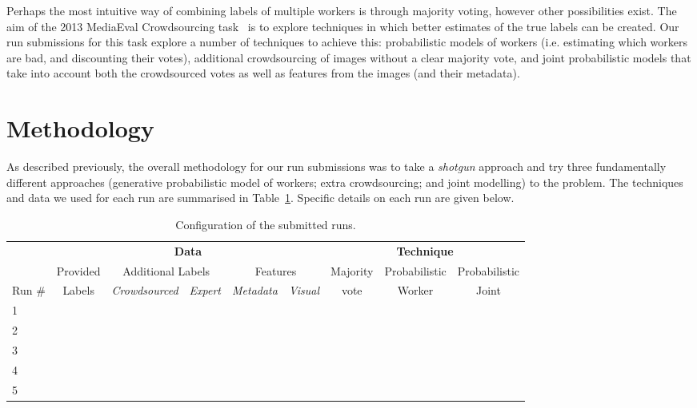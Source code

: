 \documentclass{../acm_proc_article-me11_tweaked}
\begin{document}
Perhaps the most intuitive way of combining labels of multiple workers is through majority voting, however other possibilities exist. The aim of the 2013 MediaEval Crowdsourcing task~\cite{CS2013} is to explore techniques in which better estimates of the true labels can be created. Our run submissions for this task explore a number of techniques to achieve this: probabilistic models of workers (i.e. estimating which workers are bad, and discounting their votes), additional crowdsourcing of images without a clear majority vote, and joint probabilistic models that take into account both the crowdsourced votes as well as features from the images (and their metadata).
	
\section{Methodology}
As described previously, the overall methodology for our run submissions was to take a \emph{shotgun} approach and try three fundamentally different approaches (generative probabilistic model of workers; extra crowdsourcing; and joint modelling) to the problem. The techniques and data we used for each run are summarised in Table~\ref{tab:config}. Specific details on each run are given below.

\begin{table}[t]
	\centering
	\caption{\label{tab:config}Configuration of the submitted runs.}
	\begin{tabular}{|l||c|c|c|c|c||c|c|c|}
		\hline	
		& \multicolumn{5}{c||}{\textbf{Data}} & \multicolumn{3}{c|}{\textbf{Technique}}\\
		\cline{2-9}
	& Provided & \multicolumn{2}{c|}{Additional Labels} & \multicolumn{2}{c||}{Features} & Majority & Probabilistic & Probabilistic\\
	\cline{3-6}
	Run \# & Labels & \emph{Crowdsourced} & \emph{Expert} & \emph{Metadata} & \emph{Visual} & vote & Worker & Joint\\
	
	\hline\hline
	1 & \checkmark & & & & & & \checkmark & \\ \hline
	2 & \checkmark & \checkmark & \checkmark & & & \checkmark & & \\ \hline
	3 & \checkmark & \checkmark & \checkmark & & & & \checkmark & \\ \hline
	4 & \checkmark & \checkmark & \checkmark & \checkmark & & & & \checkmark \\ \hline
	5 & \checkmark & \checkmark & \checkmark & \checkmark & \checkmark & & &\checkmark \\ \hline
	\end{tabular}
\end{table}
\end{document}
